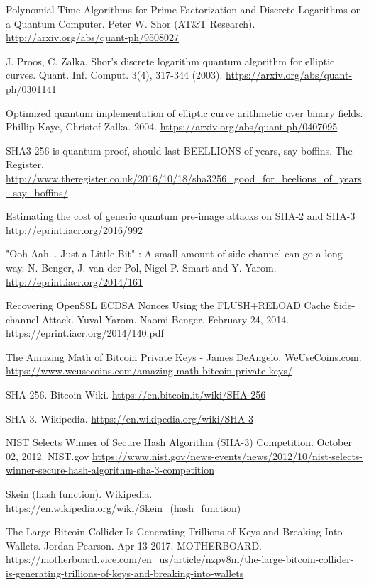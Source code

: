 \documentclass[11pt]{article}
\begin{document}
\begin{thebibliography}{7}
Polynomial-Time Algorithms for Prime Factorization and Discrete Logarithms on a Quantum Computer. Peter W. Shor (AT\&T Research).
\url{http://arxiv.org/abs/quant-ph/9508027}

J. Proos, C. Zalka, Shor's discrete logarithm quantum algorithm for elliptic curves. Quant. Inf. Comput. 3(4), 317-344 (2003).
\url{https://arxiv.org/abs/quant-ph/0301141}

Optimized quantum implementation of elliptic curve arithmetic over binary fields. Phillip Kaye, Christof Zalka. 2004.
\url{https://arxiv.org/abs/quant-ph/0407095}

SHA3-256 is quantum-proof, should last BEELLIONS of years, say boffins. The Register.
\url{http://www.theregister.co.uk/2016/10/18/sha3256_good_for_beelions_of_years_say_boffins/}

Estimating the cost of generic quantum pre-image attacks on SHA-2 and SHA-3
\url{http://eprint.iacr.org/2016/992}

"Ooh Aah... Just a Little Bit" : A small amount of side channel can go a long way. N. Benger, J. van der Pol, Nigel P. Smart and Y. Yarom.
\url{http://eprint.iacr.org/2014/161}

Recovering OpenSSL ECDSA Nonces Using the FLUSH+RELOAD Cache Side-channel Attack. Yuval Yarom. Naomi Benger. February 24, 2014.
\url{https://eprint.iacr.org/2014/140.pdf}

The Amazing Math of Bitcoin Private Keys - James DeAngelo. WeUseCoins.com.
\url{https://www.weusecoins.com/amazing-math-bitcoin-private-keys/}

SHA-256. Bitcoin Wiki.
\url{https://en.bitcoin.it/wiki/SHA-256}

SHA-3. Wikipedia.
\url{https://en.wikipedia.org/wiki/SHA-3}

NIST Selects Winner of Secure Hash Algorithm (SHA-3) Competition. October 02, 2012. NIST.gov
\url{https://www.nist.gov/news-events/news/2012/10/nist-selects-winner-secure-hash-algorithm-sha-3-competition}

Skein (hash function). Wikipedia.
\url{https://en.wikipedia.org/wiki/Skein_(hash_function)}

The Large Bitcoin Collider Is Generating Trillions of Keys and Breaking Into Wallets. Jordan Pearson. Apr 13 2017. MOTHERBOARD.
\url{https://motherboard.vice.com/en_us/article/nzpv8m/the-large-bitcoin-collider-is-generating-trillions-of-keys-and-breaking-into-wallets}


\end{thebibliography}
\end{document}
